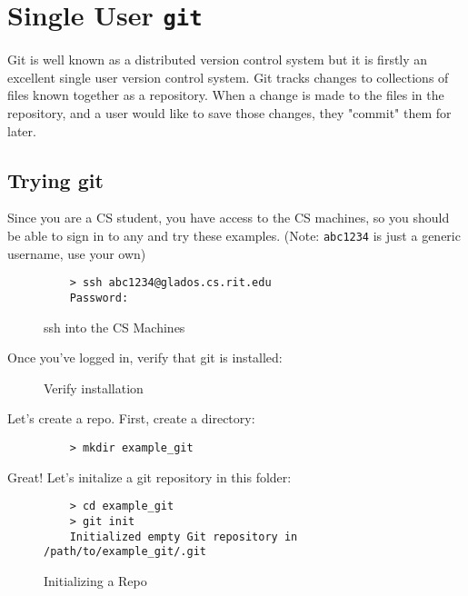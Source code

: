 \documentclass[11pt]{report}
\begin{document}
\chapter{Single User \texttt{git}}
Git is well known as a distributed version control system but it is
firstly an excellent single user version control system\cite{gitscm}.
Git tracks changes to collections of files known together as a repository.
When a change is made to the files in the repository, and a user would like
to save those changes, they "commit" them for later.

\section{Trying git}
Since you are a CS student,
you have access to the CS machines, so you should be able to sign in to any and
try these examples. (Note: \texttt{abc1234} is just a generic username, use your own)

\begin{figure}[H]
  \caption{ssh into the CS Machines}
  \begin{lstlisting}
    > ssh abc1234@glados.cs.rit.edu
    Password:
  \end{lstlisting}
\end{figure}

Once you've logged in, verify that git is installed:

\begin{figure}[H]\end{figure}
\begin{figure}[H]\caption{Verify installation}\end{figure}

Let's create a repo. First, create a directory:
\begin{figure}[H]
  \begin{lstlisting}
    > mkdir example_git
  \end{lstlisting}
\end{figure}

Great! Let's initalize a git repository in this folder:
\begin{figure}[H]
  \caption{Initializing a Repo}
  \begin{lstlisting}
    > cd example_git
    > git init
    Initialized empty Git repository in /path/to/example_git/.git
  \end{lstlisting}
\end{figure}
\end{document}

